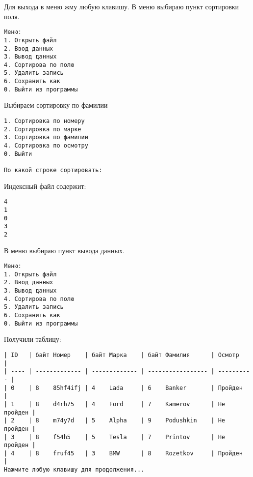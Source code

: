 Для выхода в меню жму любую клавишу. В меню выбираю пункт сортировки поля.

\begin{tcolorbox}
\begin{verbatim}
Меню:
1. Открыть файл
2. Ввод данных       
3. Вывод данных      
4. Сортирова по полю 
5. Удалить запись    
6. Сохранить как     
0. Выйти из программы
\end{verbatim}
\end{tcolorbox}

Выбираем сортировку по фамилии

\begin{tcolorbox}
\begin{verbatim}
1. Сортировка по номеру
2. Сортировка по марке
3. Сортировка по фамилии
4. Сортировка по осмотру
0. Выйти

По какой строке сортировать: 
\end{verbatim}
\end{tcolorbox}

Индексный файл содержит:

\begin{tcolorbox}
\begin{verbatim}
4
1
0
3
2
\end{verbatim}
\end{tcolorbox}

В меню выбираю пункт вывода данных.

\begin{tcolorbox}
\begin{verbatim}
Меню:
1. Открыть файл
2. Ввод данных       
3. Вывод данных      
4. Сортирова по полю 
5. Удалить запись    
6. Сохранить как     
0. Выйти из программы
\end{verbatim}
\end{tcolorbox}

Получили таблицу:

\begin{tcolorbox}
\begin{verbatim}
| ID   | байт Номер    | байт Марка    | байт Фамилия      | Осмотр     | 
| ---- | ------------- | ------------- | ----------------- | ---------- | 
| 0    | 8    85hf4ifj | 4    Lada     | 6    Banker       | Пройден    | 
| 1    | 8    d4rh75   | 4    Ford     | 7    Kamerov      | Не пройден | 
| 2    | 8    m74y7d   | 5    Alpha    | 9    Podushkin    | Не пройден | 
| 3    | 8    f54h5    | 5    Tesla    | 7    Printov      | Не пройден | 
| 4    | 8    fruf45   | 3    BMW      | 8    Rozetkov     | Пройден    | 
Нажмите любую клавишу для продолжения...
\end{verbatim}
\end{tcolorbox}

